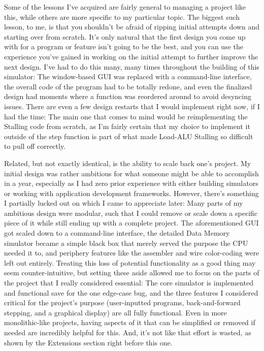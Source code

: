 \documentclass[12pt,twoside]{reedthesis}
\begin{document}
Some of the lessons I've acquired are fairly general to managing a project like this, while others are more specific to my particular topic. The biggest such lesson, to me, is that you shouldn't be afraid of ripping initial attempts down and starting over from scratch. It's only natural that the first design you come up with for a program or feature isn't going to be the best, and you can use the experience you've gained in working on the initial attempt to further improve the next design. I've had to do this many, many times throughout the building of this simulator: The window-based GUI was replaced with a command-line interface, the overall code of the program had to be totally redone, and even the finalized design had moments where a function was reordered around to avoid desyncing issues. There are even a few design restarts that I would implement right now, if I had the time: The main one that comes to mind would be reimplementing the Stalling code from scratch, as I'm fairly certain that my choice to implement it outside of the step function is part of what made Load-ALU Stalling so difficult to pull off correctly.

Related, but not exactly identical, is the ability to scale back one's project. My initial design was rather ambitious for what someone might be able to accomplish in a year, especially as I had zero prior experience with either building simulators or working with application development frameworks. However, there's something I partially lucked out on which I came to appreciate later: Many parts of my ambitious design were modular, such that I could remove or scale down a specific piece of it while still ending up with a complete project. The aforementioned GUI got scaled down to a command-line interface, the detailed Data Memory simulator became a simple black box that merely served the purpose the CPU needed it to, and periphery features like the assembler and wire color-coding were left out entirely. Treating this loss of potential functionality as a good thing may seem counter-intuitive, but setting these aside allowed me to focus on the parts of the project that I really considered essential: The core simulator is implemented and functional save for the one edge-case bug, and the three features I considered critical for the project's purpose (user-inputted programs, back-and-forward stepping, and a graphical display) are all fully functional. Even in more monolithic-like projects, having aspects of it that can be simplified or removed if needed are incredibly helpful for this. And, it's not like that effort is wasted, as shown by the Extensions section right before this one.
\end{document}
